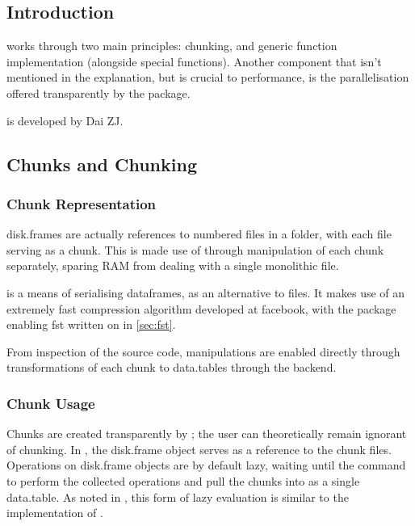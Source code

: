 \subsection{Introduction}\label{sec:disk-frame-introduction}

 works through two main principles: chunking, and generic
function implementation (alongside special functions). Another component
that isn't mentioned in the explanation, but is crucial to performance,
is the parallelisation offered transparently by the package.

 is developed by Dai ZJ.

\subsection{Chunks and Chunking}\label{sec:chunking}

\subsubsection{Chunk Representation}\label{sec:chunk-representation}

disk.frames are actually references to numbered  files in a
folder, with each file serving as a chunk. This is made use of through
manipulation of each chunk separately, sparing RAM from dealing with a
single monolithic file\cite{zj19:_inges_data}.

 is a means of serialising dataframes, as an alternative to 
files\cite{klik19}. It makes use of an extremely fast compression
algorithm developed at facebook, with the \R package enabling fst written on in \cref{sec:fst}.

From inspection of the source code,  manipulations are enabled
directly through transformations of each chunk to data.tables through
the  backend.

\subsubsection{Chunk Usage}\label{sec:making-chunks}

Chunks are created transparently by ; the user can
theoretically remain ignorant of chunking. In \R, the disk.frame object
serves as a reference to the chunk files. Operations on disk.frame
objects are by default lazy, waiting until the
 command to perform the
collected operations and pull the chunks into \R as a single data.table.
As noted in \cite{zj19:_simpl_verbs_lazy_evaluat}, this form of lazy
evaluation is similar to the implementation of .

